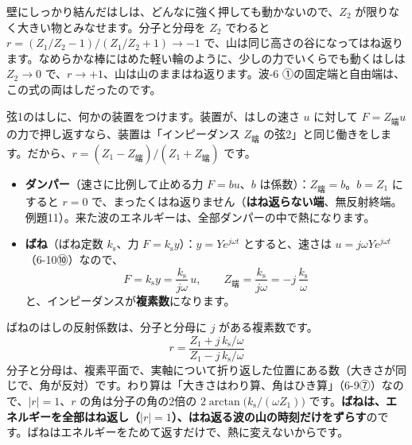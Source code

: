 \begin{phflow}
\end{phflow}
\label{ph:波-7:koteitan}壁にしっかり結んだはしは、どんなに強く押しても動かないので、$Z_2$ が限りなく大きい物とみなせます。分子と分母を $Z_2$ でわると $r=(Z_1/Z_2-1)/(Z_1/Z_2+1)\to-1$ で、山は同じ高さの谷になってはね返ります。なめらかな棒にはめた軽い輪のように、少しの力でいくらでも動くはしは $Z_2\to0$ で、$r\to+1$、山は山のままはね返ります。波-6 ①の固定端と自由端は、この式の両はしだったのです。

弦1のはしに、何かの装置をつけます。装置が、はしの速さ $u$ に対して $F=Z_{\text{端}}u$ の力で押し返すなら、装置は「インピーダンス $Z_{\text{端}}$ の弦2」と同じ働きをします。だから、$r=(Z_1-Z_{\text{端}})/(Z_1+Z_{\text{端}})$ です。
\begin{itemize}[leftmargin=1.2\zw, itemsep=2pt, topsep=2pt, label={\color{bkTheme}●}]
\item \textbf{ダンパー}（速さに比例して止める力 $F=bu$、$b$ は係数）：$Z_{\text{端}}=b$。$b=Z_1$ にすると $r=0$ で、まったくはね返りません（\textbf{はね返らない端}、無反射終端。例題11）。来た波のエネルギーは、全部ダンパーの中で熱になります。
\item \textbf{ばね}（ばね定数 $k_{\mathrm s}$、力 $F=k_{\mathrm s}y$）：$y=Ye^{j\omega t}$ とすると、速さは $u=j\omega Y e^{j\omega t}$（6-10⑩）なので、
\[F=k_{\mathrm s}y=\frac{k_{\mathrm s}}{j\omega}\,u,\qquad Z_{\text{端}}=\frac{k_{\mathrm s}}{j\omega}=-j\,\frac{k_{\mathrm s}}{\omega}\]
と、インピーダンスが\textbf{複素数}になります。
\end{itemize}

ばねのはしの反射係数は、分子と分母に $j$ がある複素数です。
\[r=\frac{Z_1+j\,k_{\mathrm s}/\omega}{Z_1-j\,k_{\mathrm s}/\omega}\]
分子と分母は、複素平面で、実軸について折り返した位置にある数（大きさが同じで、角が反対）です。わり算は「大きさはわり算、角はひき算」（6-9⑦）なので、$|r|=1$、$r$ の角は分子の角の2倍の $2\arctan\bigl(k_{\mathrm s}/(\omega Z_1)\bigr)$ です。\textbf{ばねは、エネルギーを全部はね返し（$|r|=1$）、はね返る波の山の時刻だけをずらす}のです。ばねはエネルギーをためて返すだけで、熱に変えないからです。

